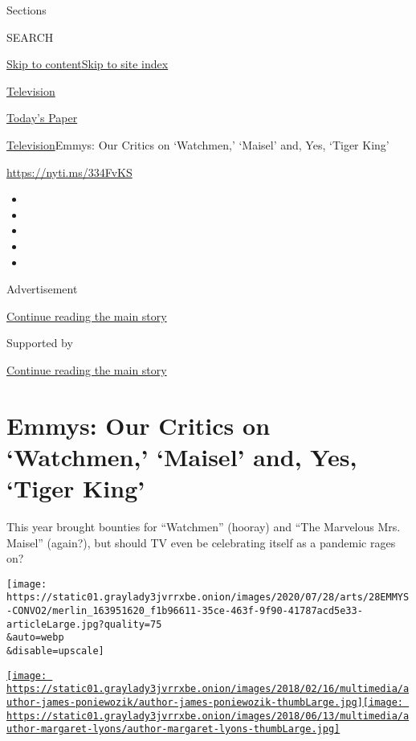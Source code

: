 Sections

SEARCH

\protect\hyperlink{site-content}{Skip to
content}\protect\hyperlink{site-index}{Skip to site index}

\href{https://www.nytimes3xbfgragh.onion/section/arts/television}{Television}

\href{https://myaccount.nytimes3xbfgragh.onion/auth/login?response_type=cookie\&client_id=vi}{}

\href{https://www.nytimes3xbfgragh.onion/section/todayspaper}{Today's
Paper}

\href{/section/arts/television}{Television}\textbar{}Emmys: Our Critics
on `Watchmen,' `Maisel' and, Yes, `Tiger King'

\url{https://nyti.ms/334FvKS}

\begin{itemize}
\item
\item
\item
\item
\item
\end{itemize}

Advertisement

\protect\hyperlink{after-top}{Continue reading the main story}

Supported by

\protect\hyperlink{after-sponsor}{Continue reading the main story}

\hypertarget{emmys-our-critics-on-watchmen-maisel-and-yes-tiger-king}{%
\section{Emmys: Our Critics on `Watchmen,' `Maisel' and, Yes, `Tiger
King'}\label{emmys-our-critics-on-watchmen-maisel-and-yes-tiger-king}}

This year brought bounties for ``Watchmen'' (hooray) and ``The Marvelous
Mrs. Maisel'' (again?), but should TV even be celebrating itself as a
pandemic rages on?

\texttt{[image: https://static01.graylady3jvrrxbe.onion/images/2020/07/28/arts/28EMMYS-CONVO2/merlin\_163951620\_f1b96611-35ce-463f-9f90-41787acd5e33-articleLarge.jpg?quality=75\\\&auto=webp\\\&disable=upscale]}

\href{https://www.nytimes3xbfgragh.onion/by/james-poniewozik}{\texttt{[image: https://static01.graylady3jvrrxbe.onion/images/2018/02/16/multimedia/author-james-poniewozik/author-james-poniewozik-thumbLarge.jpg]}}\href{https://www.nytimes3xbfgragh.onion/by/margaret-lyons}{\texttt{[image: https://static01.graylady3jvrrxbe.onion/images/2018/06/13/multimedia/author-margaret-lyons/author-margaret-lyons-thumbLarge.jpg]}}

